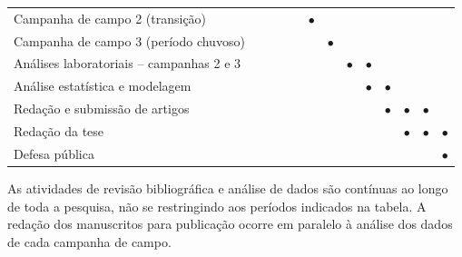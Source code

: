 \begin{table}[H]
\begin{tabularx}{\textwidth}{Xcccccccccccc}
    Campanha de campo 2 (transição)
      &            &            &
      &            & $\bullet$ &
      &            &            &
      &            &            & \\
    \thinrule
    Campanha de campo 3 (período chuvoso)
      &            &            &
      &            &            & $\bullet$
      &            &            &
      &            &            & \\
    \thinrule
    Análises laboratoriais -- campanhas 2 e 3
      &            &            &
      &            &            &
      & $\bullet$ & $\bullet$ &
      &            &            & \\
    \thinrule
    Análise estatística e modelagem
      &            &            &
      &            &            &
      &            & $\bullet$ & $\bullet$
      &            &            & \\
    \thinrule
    Redação e submissão de artigos
      &            &            &
      &            &            &
      &            &            & $\bullet$
      & $\bullet$ & $\bullet$ & \\
    \thinrule
    Redação da tese
      &            &            &
      &            &            &
      &            &            &
      & $\bullet$ & $\bullet$ & $\bullet$ \\
    \thinrule
    Defesa pública
      &            &            &
      &            &            &
      &            &            &
      &            &            & $\bullet$ \\
    \bottomrule
  \end{tabularx}
\end{table}

As atividades de revisão bibliográfica e análise de dados são contínuas
ao longo de toda a pesquisa, não se restringindo aos períodos
indicados na tabela. A redação dos manuscritos para publicação ocorre
em paralelo à análise dos dados de cada campanha de campo.

